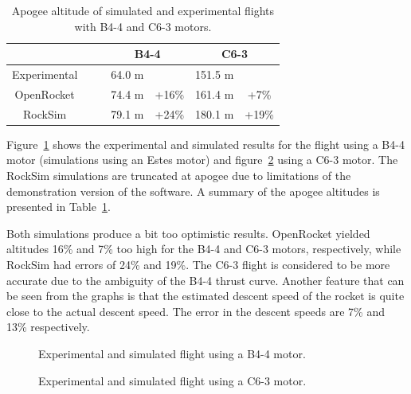 \begin{table}
\caption{Apogee altitude of simulated and experimental flights with
  B4-4 and C6-3 motors.}
\label{tab-flight-results}
\begin{center}
\begin{tabular}{ccccc}
             & \multicolumn{2}{c}{B4-4} & \multicolumn{2}{c}{C6-3} \\
\hline
Experimental~~~~ & 64.0 m &       & 151.5 m &       \\
OpenRocket~~~~   & 74.4 m & +16\% & 161.4 m & +7\%  \\
RockSim~~~~      & 79.1 m & +24\% & 180.1 m & +19\% \\
\hline
\end{tabular}
\end{center}
\end{table}


Figure~\ref{fig-flight-B4} shows the experimental and simulated
results for the flight using a B4-4 motor (simulations using an Estes
motor) and figure~\ref{fig-flight-C6} using a C6-3 motor.  The RockSim
simulations are truncated at apogee due to limitations of the
demonstration version of the software.  A summary of the apogee
altitudes is presented in Table~\ref{tab-flight-results}.  

Both simulations produce a bit too optimistic results. OpenRocket
yielded altitudes 16\% and 7\% too high for the B4-4 and C6-3 motors,
respectively, while RockSim had errors of 24\% and 19\%.  The C6-3
flight is considered to be more accurate due to the ambiguity of the
B4-4 thrust curve.
%
Another feature that can be seen from the graphs is that the estimated
descent speed of the rocket is quite close to the actual descent
speed.  The error in the descent speeds are 7\% and 13\% respectively.


\begin{figure}[p]
\centering
{}
\caption{Experimental and simulated flight using a B4-4 motor.}
\label{fig-flight-B4}
\end{figure}

\begin{figure}[p]
\centering
{}
\caption{Experimental and simulated flight using a C6-3 motor.}
\label{fig-flight-C6}
\end{figure}





